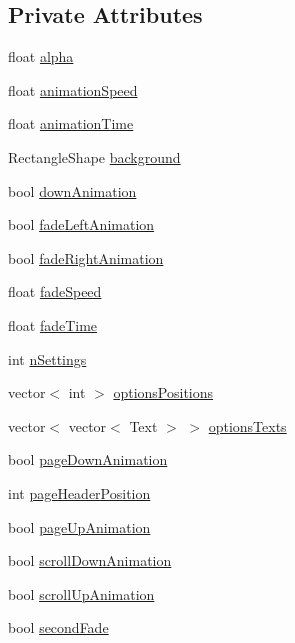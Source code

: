 \subsection*{Private Attributes}
\begin{DoxyCompactItemize}
\item 
float \hyperlink{classSettings_ad4ed30795fceb42b02937d87bac50213}{alpha}
\item 
float \hyperlink{classSettings_ae0dc78ef4c9a43cfd7d0a1b7fc2c1576}{animation\+Speed}
\item 
float \hyperlink{classSettings_ac8d966b3fddad984eb3448c82da52766}{animation\+Time}
\item 
Rectangle\+Shape \hyperlink{classSettings_adfb55e6a4950331071235bdf71e70635}{background}
\item 
bool \hyperlink{classSettings_a3ca98c2832652c799e4156c2cd9870b8}{down\+Animation}
\item 
bool \hyperlink{classSettings_a9fc3029b2d7ea3627cfb337963e5e517}{fade\+Left\+Animation}
\item 
bool \hyperlink{classSettings_a361d40b16e3a783d7ac48008a825da86}{fade\+Right\+Animation}
\item 
float \hyperlink{classSettings_ae8d4f4e2e7ff6fe49ae1fde8d5d60e3d}{fade\+Speed}
\item 
float \hyperlink{classSettings_af99154745965d7887d876893cb728d68}{fade\+Time}
\item 
int \hyperlink{classSettings_ac3d8cbf9380fd8b725e8ebd1b37b5ee6}{n\+Settings}
\item 
vector$<$ int $>$ \hyperlink{classSettings_ae35f4a510650ec63a9ef68c983b5c5f2}{options\+Positions}
\item 
vector$<$ vector$<$ Text $>$ $>$ \hyperlink{classSettings_a112aa156eec22f1984ff6f98afcec7bb}{options\+Texts}
\item 
bool \hyperlink{classSettings_a503fc01d9f2c446eb665f73f4b0bdb84}{page\+Down\+Animation}
\item 
int \hyperlink{classSettings_a57913d133488d8cd62688bfcc483b0a4}{page\+Header\+Position}
\item 
bool \hyperlink{classSettings_a382d15210e0204c9fe59a54577b25eee}{page\+Up\+Animation}
\item 
bool \hyperlink{classSettings_ae02e88347857994296383bea194f3fdf}{scroll\+Down\+Animation}
\item 
bool \hyperlink{classSettings_acef41c3ecdc8d54ae52e9dacf6a47bec}{scroll\+Up\+Animation}
\item 
bool \hyperlink{classSettings_af2fdd4e36866cd1e773749e4d3c8e36b}{second\+Fade}

\end{DoxyCompactItemize}
